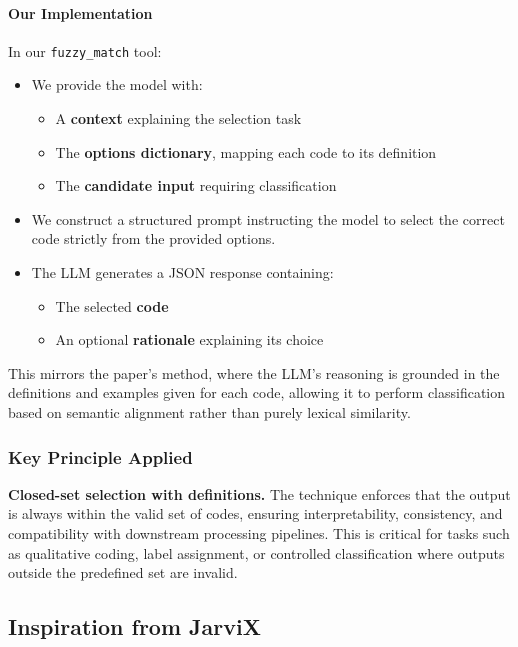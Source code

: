 \documentclass{article}
\begin{document}
\paragraph{Our Implementation}
In our \texttt{fuzzy\_match} tool:
\begin{itemize}
    \item We provide the model with:
    \begin{itemize}
        \item A \textbf{context} explaining the selection task
        \item The \textbf{options dictionary}, mapping each code to its definition
        \item The \textbf{candidate input} requiring classification
    \end{itemize}
    \item We construct a structured prompt instructing the model to select the correct code strictly from the provided options.
    \item The LLM generates a JSON response containing:
    \begin{itemize}
        \item The selected \textbf{code}
        \item An optional \textbf{rationale} explaining its choice
    \end{itemize}
\end{itemize}

This mirrors the paper's method, where the LLM’s reasoning is grounded in the definitions and examples given for each code, allowing it to perform classification based on semantic alignment rather than purely lexical similarity.

\subsubsection{Key Principle Applied}


\textbf{Closed-set selection with definitions.} The technique enforces that the output is always within the valid set of codes, ensuring interpretability, consistency, and compatibility with downstream processing pipelines. This is critical for tasks such as qualitative coding, label assignment, or controlled classification where outputs outside the predefined set are invalid.

\subsection{Inspiration from JarviX}
\end{document}
